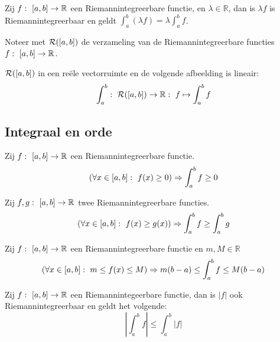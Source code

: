 \documentclass[main.tex]{subfiles}
\begin{document}
\begin{bpr}
  Zij $f:\ \interval{a}{b} \rightarrow \mathbb{R}$ een Riemannintegreerbare functie, en $\lambda \in \mathbb{R}$, dan is $\lambda f$ is Riemannintegreerbaar en geldt $\int_{a}^{b}(\lambda f) = \lambda \int_{a}^{b}f$.
\end{bpr}

\begin{de}
  Noteer met $\mathcal{R}(\interval{a}{b})$ de verzameling van de Riemannintegreerbare functies $f:\ \interval{a}{b} \rightarrow \mathbb{R}$.
\end{de}

\begin{bgev}
  $\mathcal{R}(\interval{a}{b})$ in een re\"ele vectorruimte en de volgende afbeelding is lineair:
  \[ \int_{a}^{b}:\ \mathcal{R}(\interval{a}{b}) \rightarrow \mathbb{R}:\ f \mapsto \int_{a}^{b}f \]
\end{bgev}

\subsection{Integraal en orde}
\label{sec:integraal-en-orde}

\begin{bpr}
  Zij $f:\ \interval{a}{b} \rightarrow \mathbb{R}$ een Riemannintegreerbare functie.
  \[ \left( \forall x\in \interval{a}{b}:\ f(x) \ge 0 \right) \Rightarrow \int_{a}^{b} f \ge 0 \]
\end{bpr}

\begin{bpr}
  Zij $f,g:\ \interval{a}{b} \rightarrow \mathbb{R}$ twee Riemannintegreerbare functies.
  \[ \left( \forall x\in \interval{a}{b}:\ f(x) \ge g(x) \right) \Rightarrow \int_{a}^{b} f \ge \int_{a}^{b}g \]
\end{bpr}

\begin{bpr}
  Zij $f:\ \interval{a}{b} \rightarrow \mathbb{R}$ een Riemannintegreerbare functie en $m,M \in \mathbb{R}$
  \[ \left( \forall x\in \interval{a}{b}:\ m \le f(x) \le M \right) \Rightarrow m(b-a) \le \int_{a}^{b}f \le M(b-a) \]
\end{bpr}

\begin{bpr}
  Zij $f:\ \interval{a}{b} \rightarrow \mathbb{R}$ een Riemannintegeerbare functie, dan is $|f|$ ook Riemannintegreerbaar en geldt het volgende:
  \[ \left| \int_{a}^{b}f \right| \le \int_{a}^{b}|f| \]
\end{bpr}
\end{document}
